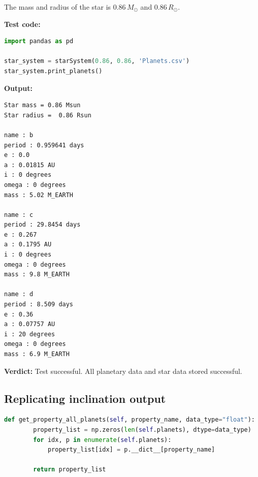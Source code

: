 \documentclass[11pt, oneside]{article}   	%
\begin{document}
The mass and radius of the star is $0.86\, M_{\odot}$ and $0.86\, R_{\odot}$.

\textbf{Test code:}
\begin{lstlisting}[language=Python, caption={Test of star system object}]
import pandas as pd

star_system = starSystem(0.86, 0.86, 'Planets.csv')
star_system.print_planets()
\end{lstlisting}

\textbf{Output:}
\begin{verbatim}
Star mass = 0.86 Msun
Star radius =  0.86 Rsun

name : b
period : 0.959641 days
e : 0.0
a : 0.01815 AU
i : 0 degrees
omega : 0 degrees
mass : 5.02 M_EARTH

name : c
period : 29.8454 days
e : 0.267
a : 0.1795 AU
i : 0 degrees
omega : 0 degrees
mass : 9.8 M_EARTH

name : d
period : 8.509 days
e : 0.36
a : 0.07757 AU
i : 20 degrees
omega : 0 degrees
mass : 6.9 M_EARTH
\end{verbatim}

\textbf{Verdict:} Test successful. All planetary data and star data stored successful.

\subsection{Replicating inclination output}

\begin{lstlisting}[language=Python, caption={Helper function to get a property value of all planets}]
    def get_property_all_planets(self, property_name, data_type="float"):
        property_list = np.zeros(len(self.planets), dtype=data_type)
        for idx, p in enumerate(self.planets):
            property_list[idx] = p.__dict__[property_name]

        return property_list
\end{lstlisting}
\end{document}
